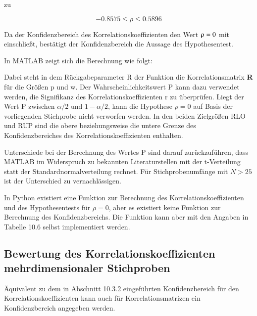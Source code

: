 \noindent zu

\begin{equation}\label{eq:tensixtyeight}
-0.8575\le \rho \le 0.5896
\end{equation}

\noindent Da der Konfidenzbereich des Korrelationskoeffizienten den Wert $\rhoup = 0$ mit einschlie{\ss}t, best\"{a}tigt der Konfidenzbereich die Aussage des Hypothesentest.\newline

\noindent In MATLAB zeigt sich die Berechnung wie folgt:



\noindent Dabei steht in dem R\"{u}ckgabeparameter R der Funktion die Korrelationsmatrix \textbf{R} f\"{u}r die Gr\"{o}{\ss}en p und w. Der Wahrscheinlichkeitswert P kann dazu verwendet werden, die Signifikanz des Korrelationskoeffizienten r zu \"{u}berpr\"{u}fen. Liegt der Wert P zwischen $\alpha/2$ und $1 - \alpha/2$, kann die Hypothese $\rho = 0$ auf Basis der vorliegenden Stichprobe nicht verworfen werden. In den beiden Zielgr\"{o}{\ss}en RLO und RUP sind die obere beziehungsweise die untere Grenze des Konfidenzbereiches des Korrelationskoeffizienten enthalten.\newline

\noindent Unterschiede bei der Berechnung des Wertes P sind darauf zur\"{u}ckzuf\"{u}hren, dass MATLAB im Widerspruch zu bekannten Literaturstellen mit der t-Verteilung statt der Standardnormalverteilung rechnet. F\"{u}r Stichprobenumf\"{a}nge mit $N > 25$ ist der Unterschied zu vernachl\"{a}ssigen.

\noindent In Python existiert eine Funktion zur Berechnung des Korrelationskoeffizienten und des Hypothesentests f\"{u}r $\rho = 0$, aber es existiert keine Funktion zur Berechnung des Konfidenzbereichs. Die Funktion kann aber mit den Angaben in Tabelle 10.6 selbst implementiert werden.



\subsection{Bewertung des Korrelationskoeffizienten mehrdimensionaler Stichproben}

\noindent \"{A}quivalent zu dem in Abschnitt 10.3.2 eingef\"{u}hrten Konfidenzbereich f\"{u}r den Korrelationskoeffizienten kann auch f\"{u}r Korrelationsmatrizen ein Konfidenzbereich angegeben werden.


